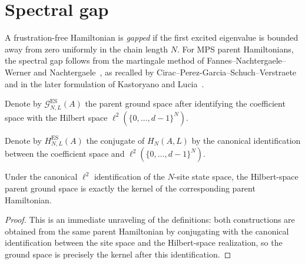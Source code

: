 \section{Spectral gap}\label{sec:spectral_gap}

A frustration-free Hamiltonian is \emph{gapped} if the first excited
eigenvalue is bounded away from zero uniformly in the chain length $N$.
For MPS parent Hamiltonians, the spectral gap follows from the martingale
method of Fannes--Nachtergaele--Werner and
Nachtergaele~\cite{Fannes1992Finitely, Nachtergaele1996Spectral}, as recalled
by Cirac--Perez-Garcia--Schuch--Verstraete~\cite[Section~IV.C]{Cirac2021Matrix}
and in the later formulation of Kastoryano and
Lucia~\cite{Kastoryano2018Martingale}.

\begin{definition}
    \label{def:parent_ground_space_es}
    \leanok
    Denote by $\mathcal G_{N,L}^{\mathrm{ES}}(A)$ the parent ground space after
    identifying the coefficient space with the Hilbert space
    $\ell^{2}(\{0,\ldots,d-1\}^N)$.
\end{definition}

\begin{definition}
    \label{def:parent_hamiltonian_es}
    \leanok
    Denote by $H_{N,L}^{\mathrm{ES}}(A)$ the conjugate of $H_{N}(A,L)$ by the
    canonical identification between the coefficient space and
    $\ell^{2}(\{0,\ldots,d-1\}^N)$.
\end{definition}

\begin{theorem}
    \label{thm:parent_ground_space_es_kernel}
    \leanok
    Under the canonical $\ell^2$ identification of the $N$-site state space, the
    Hilbert-space parent ground space is exactly the kernel of the corresponding
    parent Hamiltonian.
\end{theorem}

\begin{proof}
    \leanok
    This is an immediate unraveling of the definitions: both constructions are
    obtained from the same parent Hamiltonian by conjugating with the canonical
    identification between the site space and the Hilbert-space realization, so
    the ground space is precisely the kernel after this identification.
\end{proof}

